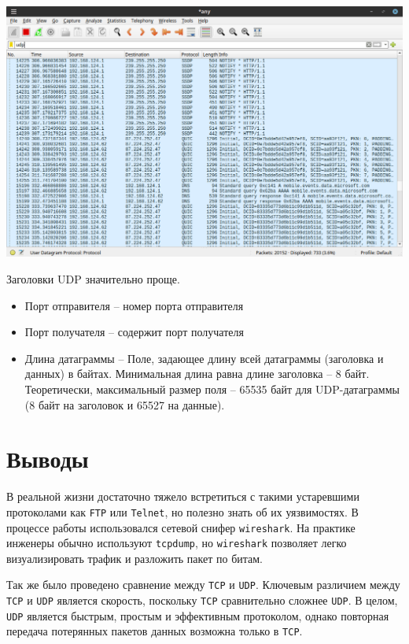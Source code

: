 \begin{center}
    \includegraphics[scale=0.5]{res/5.wireshark-udp.png}
\end{center}

Заголовки UDP значительно проще.
\begin{itemize}
    \item Порт отправителя -- номер порта отправителя
    \item Порт получателя -- содержит порт получателя
    \item Длина датаграммы -- Поле, задающее длину всей датаграммы (заголовка и данных) в байтах. Минимальная длина равна длине заголовка -- 8 байт. Теоретически, максимальный размер поля -- 65535 байт для UDP-датаграммы (8 байт на заголовок и 65527 на данные).
\end{itemize}

\section*{Выводы}

В реальной жизни достаточно тяжело встретиться с такими устаревшими протоколами как \texttt{FTP} или \texttt{Telnet}, но полезно знать об их уязвимостях. В процессе работы использовался сетевой снифер \texttt{wireshark}. На практике инженеры обычно используют \texttt{tcpdump}, но \texttt{wireshark} позволяет легко визуализировать трафик и разложить пакет по битам.

Так же было проведено сравнение между \texttt{TCP} и \texttt{UDP}. Ключевым различием между \texttt{TCP} и \texttt{UDP} является скорость, поскольку \texttt{TCP} сравнительно сложнее \texttt{UDP}. В целом, \texttt{UDP} является быстрым, простым и эффективным протоколом, однако повторная передача потерянных пакетов данных возможна только в \texttt{TCP}.